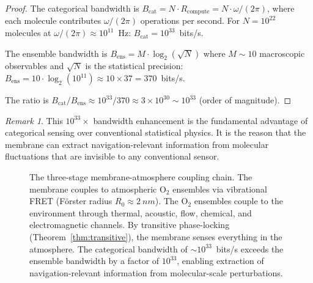 \documentclass[twocolumn,10pt]{article}
\theoremstyle{definition}
\theoremstyle{remark}
\newtheorem{remark}[theorem]{Remark}
\newcommand{\Rcompute}{R_{\mathrm{compute}}}
\begin{document}
\begin{proof}
The categorical bandwidth is $B_{\mathrm{cat}} = N \cdot \Rcompute = N \cdot \omega/(2\pi)$, where each molecule contributes $\omega/(2\pi)$ operations per second. For $N = 10^{22}$ molecules at $\omega/(2\pi) \approx 10^{11}$~Hz: $B_{\mathrm{cat}} = 10^{33}$~bits/s.

The ensemble bandwidth is $B_{\mathrm{ens}} = M \cdot \log_2(\sqrt{N})$ where $M \sim 10$ macroscopic observables and $\sqrt{N}$ is the statistical precision: $B_{\mathrm{ens}} = 10 \cdot \log_2(10^{11}) \approx 10 \times 37 = 370$~bits/s.

The ratio is $B_{\mathrm{cat}}/B_{\mathrm{ens}} \approx 10^{33}/370 \approx 3 \times 10^{30} \sim 10^{33}$ (order of magnitude).
\end{proof}

\begin{remark}
This $10^{33}\times$ bandwidth enhancement is the fundamental advantage of categorical sensing over conventional statistical physics. It is the reason that the membrane can extract navigation-relevant information from molecular fluctuations that are invisible to any conventional sensor.
\end{remark}

\begin{figure}[H]
\centering
{}
\caption{The three-stage membrane-atmosphere coupling chain. The membrane couples to atmospheric $\mathrm{O}_2$ ensembles via vibrational FRET (F\"orster radius $R_0 \approx \SI{2}{nm}$). The $\mathrm{O}_2$ ensembles couple to the environment through thermal, acoustic, flow, chemical, and electromagnetic channels. By transitive phase-locking (Theorem~\ref{thm:transitive}), the membrane senses everything in the atmosphere. The categorical bandwidth of $\sim 10^{33}$~bits/s exceeds the ensemble bandwidth by a factor of $10^{33}$, enabling extraction of navigation-relevant information from molecular-scale perturbations.}
\label{fig:coupling_chain}
\end{figure}
\end{document}
